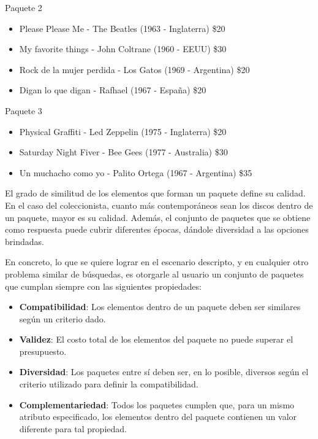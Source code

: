 \begin{mybox}{Paquete 2}
	\begin{itemize}
		\item {\scriptsize Please Please Me - The Beatles (1963 - Inglaterra) \$20}
		\item {\scriptsize My favorite things - John Coltrane (1960 - EEUU) \$30}
		\item {\scriptsize Rock de la mujer perdida - Los Gatos (1969 - Argentina) \$20}
		\item {\scriptsize Digan lo que digan - Rafhael (1967 - España) \$20}
	\end{itemize}
\end{mybox}

\begin{mybox}{Paquete 3}
	\begin{itemize}
		\item {\scriptsize Physical Graffiti - Led Zeppelin (1975 - Inglaterra) \$20}
		\item {\scriptsize Saturday Night Fiver - Bee Gees (1977 - Australia) \$30}
		\item {\scriptsize Un muchacho como yo - Palito Ortega (1967 - Argentina) \$35}
	\end{itemize}
\end{mybox}

El grado de similitud de los elementos que forman un paquete define su calidad. En el caso del coleccionista, cuanto más contemporáneos sean los discos dentro de un paquete, mayor es su calidad. Además, el conjunto de paquetes que se obtiene como respuesta puede cubrir diferentes épocas, dándole diversidad a las opciones brindadas. 

En concreto, lo que se quiere lograr en el escenario descripto, y en cualquier otro problema similar de búsquedas, es otorgarle al usuario un conjunto de paquetes que cumplan siempre con las siguientes propiedades: 

\begin{itemize}
\item \textbf{Compatibilidad}: Los elementos dentro de un paquete deben ser similares según un criterio dado.
\item \textbf{Validez}: El costo total de los elementos del paquete no puede superar el presupuesto.
\item \textbf{Diversidad}: Los paquetes entre sí deben ser, en lo posible, diversos según el criterio utilizado para definir la compatibilidad.
\item \textbf{Complementariedad}: Todos los paquetes cumplen que, para un mismo atributo especificado, los elementos dentro del paquete contienen un valor diferente para tal propiedad.
\end{itemize}

